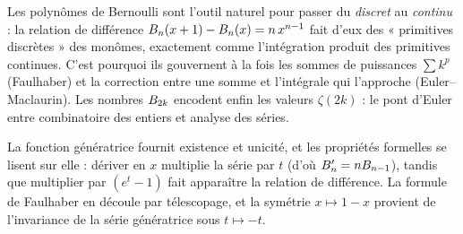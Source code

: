 \begin{significationintuitive}
Les polynômes de Bernoulli sont l'outil naturel pour passer du \emph{discret}
au \emph{continu} : la relation de différence $B_{n}(x+1)-B_{n}(x)=n\,x^{n-1}$
fait d'eux des « primitives discrètes » des monômes, exactement comme
l'intégration produit des primitives continues. C'est pourquoi ils gouvernent
à la fois les sommes de puissances $\sum k^{p}$ (Faulhaber) et la correction
entre une somme et l'intégrale qui l'approche (Euler--Maclaurin). Les nombres
$B_{2k}$ encodent enfin les valeurs $\zeta(2k)$ : le pont d'Euler entre
combinatoire des entiers et analyse des séries.
\end{significationintuitive}

\decsep{}


\begin{ideepreuve}
La fonction génératrice fournit existence et unicité, et les propriétés
formelles se lisent sur elle : dériver en $x$ multiplie la série par $t$
(d'où $B_{n}'=nB_{n-1}$), tandis que multiplier par $(e^{t}-1)$ fait
apparaître la relation de différence. La formule de Faulhaber en découle par
télescopage, et la symétrie $x\mapsto 1-x$ provient de l'invariance de la série
génératrice sous $t\mapsto -t$.
\end{ideepreuve}

\vspace{10pt}

